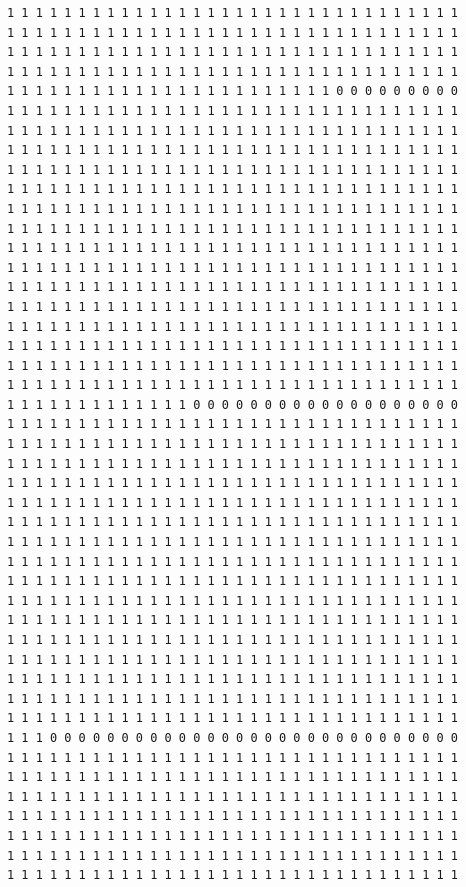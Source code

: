 \documentclass [10 pt, a4 paper]{report}
\begin{document}
\begin{lstlisting}[caption=Output of the simulation once it is finished, label={lst:code1}, frame=single]
1 1 1 1 1 1 1 1 1 1 1 1 1 1 1 1 1 1 1 1 1 1 1 1 1 1 1 1 1 1 1 1
1 1 1 1 1 1 1 1 1 1 1 1 1 1 1 1 1 1 1 1 1 1 1 1 1 1 1 1 1 1 1 1
1 1 1 1 1 1 1 1 1 1 1 1 1 1 1 1 1 1 1 1 1 1 1 1 1 1 1 1 1 1 1 1
1 1 1 1 1 1 1 1 1 1 1 1 1 1 1 1 1 1 1 1 1 1 1 1 1 1 1 1 1 1 1 1
1 1 1 1 1 1 1 1 1 1 1 1 1 1 1 1 1 1 1 1 1 1 1 0 0 0 0 0 0 0 0 0
1 1 1 1 1 1 1 1 1 1 1 1 1 1 1 1 1 1 1 1 1 1 1 1 1 1 1 1 1 1 1 1
1 1 1 1 1 1 1 1 1 1 1 1 1 1 1 1 1 1 1 1 1 1 1 1 1 1 1 1 1 1 1 1
1 1 1 1 1 1 1 1 1 1 1 1 1 1 1 1 1 1 1 1 1 1 1 1 1 1 1 1 1 1 1 1
1 1 1 1 1 1 1 1 1 1 1 1 1 1 1 1 1 1 1 1 1 1 1 1 1 1 1 1 1 1 1 1
1 1 1 1 1 1 1 1 1 1 1 1 1 1 1 1 1 1 1 1 1 1 1 1 1 1 1 1 1 1 1 1
1 1 1 1 1 1 1 1 1 1 1 1 1 1 1 1 1 1 1 1 1 1 1 1 1 1 1 1 1 1 1 1
1 1 1 1 1 1 1 1 1 1 1 1 1 1 1 1 1 1 1 1 1 1 1 1 1 1 1 1 1 1 1 1
1 1 1 1 1 1 1 1 1 1 1 1 1 1 1 1 1 1 1 1 1 1 1 1 1 1 1 1 1 1 1 1
1 1 1 1 1 1 1 1 1 1 1 1 1 1 1 1 1 1 1 1 1 1 1 1 1 1 1 1 1 1 1 1
1 1 1 1 1 1 1 1 1 1 1 1 1 1 1 1 1 1 1 1 1 1 1 1 1 1 1 1 1 1 1 1
1 1 1 1 1 1 1 1 1 1 1 1 1 1 1 1 1 1 1 1 1 1 1 1 1 1 1 1 1 1 1 1
1 1 1 1 1 1 1 1 1 1 1 1 1 1 1 1 1 1 1 1 1 1 1 1 1 1 1 1 1 1 1 1
1 1 1 1 1 1 1 1 1 1 1 1 1 1 1 1 1 1 1 1 1 1 1 1 1 1 1 1 1 1 1 1
1 1 1 1 1 1 1 1 1 1 1 1 1 1 1 1 1 1 1 1 1 1 1 1 1 1 1 1 1 1 1 1
1 1 1 1 1 1 1 1 1 1 1 1 1 1 1 1 1 1 1 1 1 1 1 1 1 1 1 1 1 1 1 1
1 1 1 1 1 1 1 1 1 1 1 1 1 0 0 0 0 0 0 0 0 0 0 0 0 0 0 0 0 0 0 0
1 1 1 1 1 1 1 1 1 1 1 1 1 1 1 1 1 1 1 1 1 1 1 1 1 1 1 1 1 1 1 1
1 1 1 1 1 1 1 1 1 1 1 1 1 1 1 1 1 1 1 1 1 1 1 1 1 1 1 1 1 1 1 1
1 1 1 1 1 1 1 1 1 1 1 1 1 1 1 1 1 1 1 1 1 1 1 1 1 1 1 1 1 1 1 1
1 1 1 1 1 1 1 1 1 1 1 1 1 1 1 1 1 1 1 1 1 1 1 1 1 1 1 1 1 1 1 1
1 1 1 1 1 1 1 1 1 1 1 1 1 1 1 1 1 1 1 1 1 1 1 1 1 1 1 1 1 1 1 1
1 1 1 1 1 1 1 1 1 1 1 1 1 1 1 1 1 1 1 1 1 1 1 1 1 1 1 1 1 1 1 1
1 1 1 1 1 1 1 1 1 1 1 1 1 1 1 1 1 1 1 1 1 1 1 1 1 1 1 1 1 1 1 1
1 1 1 1 1 1 1 1 1 1 1 1 1 1 1 1 1 1 1 1 1 1 1 1 1 1 1 1 1 1 1 1
1 1 1 1 1 1 1 1 1 1 1 1 1 1 1 1 1 1 1 1 1 1 1 1 1 1 1 1 1 1 1 1
1 1 1 1 1 1 1 1 1 1 1 1 1 1 1 1 1 1 1 1 1 1 1 1 1 1 1 1 1 1 1 1
1 1 1 1 1 1 1 1 1 1 1 1 1 1 1 1 1 1 1 1 1 1 1 1 1 1 1 1 1 1 1 1
1 1 1 1 1 1 1 1 1 1 1 1 1 1 1 1 1 1 1 1 1 1 1 1 1 1 1 1 1 1 1 1
1 1 1 1 1 1 1 1 1 1 1 1 1 1 1 1 1 1 1 1 1 1 1 1 1 1 1 1 1 1 1 1
1 1 1 1 1 1 1 1 1 1 1 1 1 1 1 1 1 1 1 1 1 1 1 1 1 1 1 1 1 1 1 1
1 1 1 1 1 1 1 1 1 1 1 1 1 1 1 1 1 1 1 1 1 1 1 1 1 1 1 1 1 1 1 1
1 1 1 1 1 1 1 1 1 1 1 1 1 1 1 1 1 1 1 1 1 1 1 1 1 1 1 1 1 1 1 1
1 1 1 0 0 0 0 0 0 0 0 0 0 0 0 0 0 0 0 0 0 0 0 0 0 0 0 0 0 0 0 0
1 1 1 1 1 1 1 1 1 1 1 1 1 1 1 1 1 1 1 1 1 1 1 1 1 1 1 1 1 1 1 1
1 1 1 1 1 1 1 1 1 1 1 1 1 1 1 1 1 1 1 1 1 1 1 1 1 1 1 1 1 1 1 1
1 1 1 1 1 1 1 1 1 1 1 1 1 1 1 1 1 1 1 1 1 1 1 1 1 1 1 1 1 1 1 1
1 1 1 1 1 1 1 1 1 1 1 1 1 1 1 1 1 1 1 1 1 1 1 1 1 1 1 1 1 1 1 1
1 1 1 1 1 1 1 1 1 1 1 1 1 1 1 1 1 1 1 1 1 1 1 1 1 1 1 1 1 1 1 1
1 1 1 1 1 1 1 1 1 1 1 1 1 1 1 1 1 1 1 1 1 1 1 1 1 1 1 1 1 1 1 1
1 1 1 1 1 1 1 1 1 1 1 1 1 1 1 1 1 1 1 1 1 1 1 1 1 1 1 1 1 1 1 1





\end{lstlisting}
\end{document}
